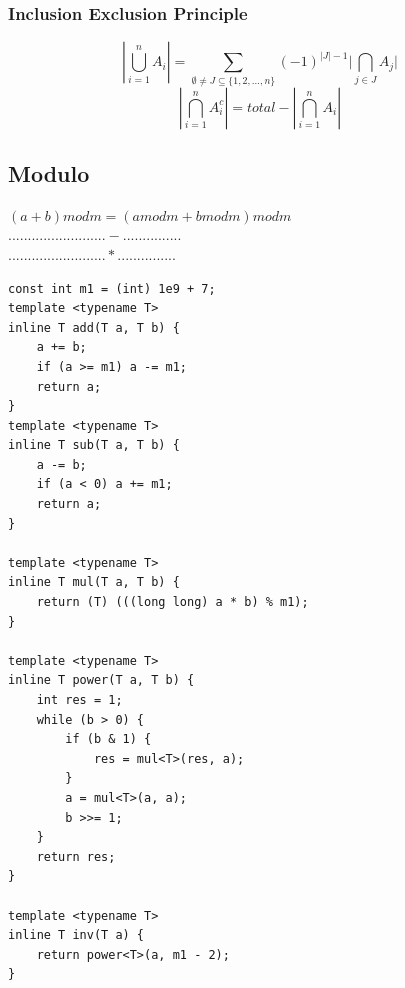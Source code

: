 \documentclass[8pt, a4paper, oneside, twocolumn]{extarticle}
\begin{document}
\subsubsection{Inclusion Exclusion Principle}
$$\left|\bigcup_{i=1}^n A_i \right| = \sum_{\emptyset \neq J\subseteq \{1,2,\ldots ,n\}} (-1)^{|J|-1}{\Biggl |}\bigcap_{j\in J}A_{j}{\Biggr |}$$
$$|\bigcap_{i = 1}^n A_{i}^c| = total - |\bigcap_{i = 1}^n A_i|$$
\subsection{Modulo}
$(a + b) mod m = (a mod m + b mod m) mod m$\\
$.........................-...............$\\
$.........................*...............$\\
\begin{verbatim}
const int m1 = (int) 1e9 + 7;
template <typename T>
inline T add(T a, T b) {
    a += b;
    if (a >= m1) a -= m1;
    return a;
}
template <typename T>
inline T sub(T a, T b) {
    a -= b;
    if (a < 0) a += m1;
    return a;
}

template <typename T>
inline T mul(T a, T b) {
    return (T) (((long long) a * b) % m1);
}

template <typename T>
inline T power(T a, T b) {
    int res = 1;
    while (b > 0) {
        if (b & 1) {
            res = mul<T>(res, a);
        }
        a = mul<T>(a, a);
        b >>= 1;
    }
    return res;
}

template <typename T>
inline T inv(T a) {
    return power<T>(a, m1 - 2);
}
\end{verbatim}
\end{document}
